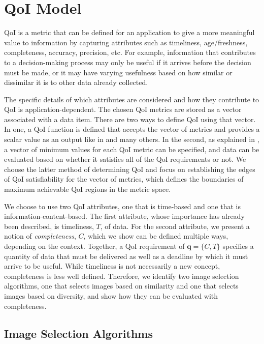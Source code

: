 \section{QoI Model}
\label{sec:qoi_model}

QoI is a metric that can be defined for an application to give a more meaningful value to information by capturing attributes such as  timeliness, age/freshness, completeness, accuracy, precision, etc.  
For example, information that contributes to a decision-making process may only be useful if it arrives before the decision must be made, or it may have varying usefulness based on how similar or dissimilar it is to other data already collected.

The specific details of which attributes are considered and how they contribute to QoI is application-dependent.  The chosen QoI metrics are stored as a vector associated with a data item.  There are two ways to define QoI using that vector.  In one, a QoI function is defined that accepts the vector of metrics and provides a scalar value as an output like in  \cite{qoi_aware_mobile_apps,qoi_aware_trx_pol_time_vary_links} and many others.  In the second, as explained in \cite{qoi_aware_tactical_mil_nets}, a vector of minimum values for each QoI metric can be specified, and data can be evaluated based on whether it satisfies all of the QoI requirements or not.  We choose the latter method of determining QoI and focus on establishing the edges of QoI satisfiability for the vector of metrics, which defines the boundaries of maximum achievable QoI regions in the metric space.

We choose to use two QoI attributes, one that is time-based and one that is information-content-based.  The first attribute, whose importance has already been described, is timeliness, $T$, of data.  For the second attribute, we present a notion of \emph{completeness}, $C$, which we show can be defined multiple ways, depending on the context.  Together, a QoI requirement of $\mathbf{q} = \{C,T\}$ specifies a quantity of data that must be delivered as well as a deadline by which it must arrive to be useful.  While timeliness is not necessarily a new concept, completeness is less well defined.  Therefore, we identify two image selection algorithms, one that selects images based on similarity and one that selects images based on diversity, and show how they can be evaluated with completeness.

\subsection{Image Selection Algorithms}


